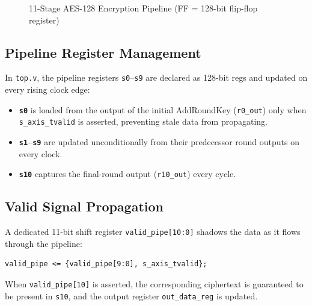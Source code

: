 \documentclass[12pt,a4paper]{article}
\begin{document}
\begin{figure}[H]
\caption{11-Stage AES-128 Encryption Pipeline (FF = 128-bit flip-flop register)}
\end{figure}

\subsection{Pipeline Register Management}

In \texttt{top.v}, the pipeline registers \texttt{s0}--\texttt{s9} are
declared as 128-bit regs and updated on every rising clock edge:

\begin{itemize}[nosep]
  \item \textbf{\texttt{s0}} is loaded from the output of the initial
        AddRoundKey (\texttt{r0\_out}) only when \texttt{s\_axis\_tvalid}
        is asserted, preventing stale data from propagating.
  \item \textbf{\texttt{s1}--\texttt{s9}} are updated unconditionally from
        their predecessor round outputs on every clock.
  \item \textbf{\texttt{s10}} captures the final-round output
        (\texttt{r10\_out}) every cycle.
\end{itemize}

\subsection{Valid Signal Propagation}

A dedicated 11-bit shift register \texttt{valid\_pipe[10:0]} shadows the
data as it flows through the pipeline:

\begin{lstlisting}[caption={Valid pipeline shift register}]
valid_pipe <= {valid_pipe[9:0], s_axis_tvalid};
\end{lstlisting}

When \texttt{valid\_pipe[10]} is asserted, the corresponding ciphertext is
guaranteed to be present in \texttt{s10}, and the output register
\texttt{out\_data\_reg} is updated.
\end{document}
